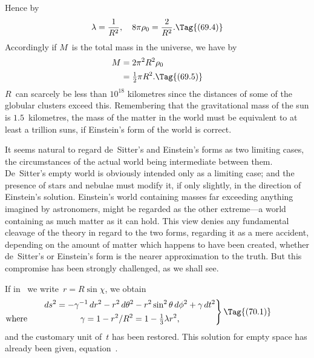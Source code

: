 \documentclass[12pt]{book}
\begin{document}
Hence by~
\[
\lambda = \frac{1}{R^{2}},\quad
8\pi\rho_{0} = \frac{2}{R^{2}}.
\Tag{(69.4)}
\]
Accordingly if $M$~is the total mass in the universe, we have by~
\begin{align*}
  M &= 2\pi^{2} R^{2} \rho_{0} \\
  &= \tfrac{1}{2}\pi R^{2}.
  \Tag{(69.5)}
\end{align*}
$R$~can scarcely be less than $10^{18}$ kilometres since the distances of some of the
globular clusters exceed this. Remembering that the gravitational mass of
the sun is $1.5$~kilometres, the mass of the matter in the world must be equivalent
to at least a trillion suns, if Einstein's form of the world is correct.

It seems natural to regard de~Sitter's and Einstein's forms as two limiting
cases, the circumstances of the actual world being intermediate between them.
De~Sitter's empty world is obviously intended only as a limiting case; and
the presence of stars and nebulae must modify it, if only slightly, in the
direction of Einstein's solution. Einstein's world containing masses far exceeding
anything imagined by astronomers, might be regarded as the other
extreme---a world containing as much matter as it can hold. This view denies
any fundamental cleavage of the theory in regard to the two forms, regarding
it as a mere accident, depending on the amount of matter which happens to
have been created, whether de~Sitter's or Einstein's form is the nearer approximation
to the truth. But this compromise has been strongly challenged,
as we shall see.

%
%
%
%
%
%

If in~ we write~$r = R\sin\chi$, we obtain
\[
\left.
\begin{gathered}
  ds^{2} = -\gamma^{-1}\, dr^{2} - r^{2}\, d\theta^{2} - r^{2}\sin^{2}\theta\, d\phi^{2} + \gamma\, dt^{2} \\
\llap{\text{where}\rule{0.87in}{0pt}}
\gamma = 1 - r^{2}/R^{2} = 1 - \tfrac{1}{3}\lambda r^{2},
\end{gathered}\right\}
\Tag{(70.1)}
\]
and the customary unit of~$t$ has been restored. This solution for empty space
has already been given, equation~.
\end{document}
